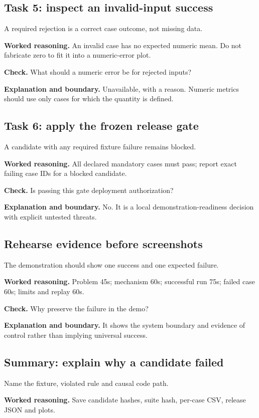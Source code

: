 \subsection{Task 5: inspect an invalid-input success}
A required rejection is a correct case outcome, not missing data.

\textbf{Worked reasoning.} An invalid case has no expected numeric mean. Do not fabricate zero to fit it into a numeric-error plot.

\textbf{Check.} What should a numeric error be for rejected inputs?

\textbf{Explanation and boundary.} Unavailable, with a reason. Numeric metrics should use only cases for which the quantity is defined.

\subsection{Task 6: apply the frozen release gate}
A candidate with any required fixture failure remains blocked.

\textbf{Worked reasoning.} All declared mandatory cases must pass; report exact failing case IDs for a blocked candidate.

\textbf{Check.} Is passing this gate deployment authorization?

\textbf{Explanation and boundary.} No. It is a local demonstration-readiness decision with explicit untested threats.

\subsection{Rehearse evidence before screenshots}
The demonstration should show one success and one expected failure.

\textbf{Worked reasoning.} Problem 45s; mechanism 60s; successful run 75s; failed case 60s; limits and replay 60s.

\textbf{Check.} Why preserve the failure in the demo?

\textbf{Explanation and boundary.} It shows the system boundary and evidence of control rather than implying universal success.

\subsection{Summary: explain why a candidate failed}
Name the fixture, violated rule and causal code path.

\textbf{Worked reasoning.} Save candidate hashes, suite hash, per-case CSV, release JSON and plots.

